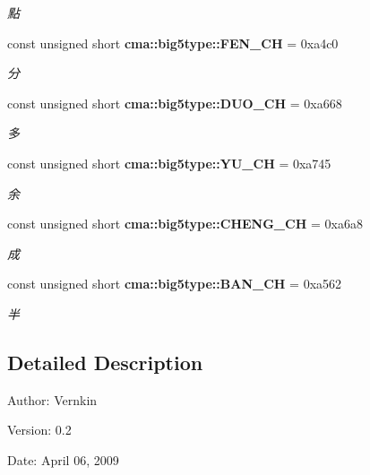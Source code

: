 \begin{CompactItemize}
\begin{CompactList}\small\item\em 點 \item\end{CompactList}\item 
const unsigned short {\bf cma::big5type::FEN\_\-CH} = 0xa4c0\label{namespacecma_1_1big5type_4dd0b0d33393c2d9a27ccee6ab9662d5}

\begin{CompactList}\small\item\em 分 \item\end{CompactList}\item 
const unsigned short {\bf cma::big5type::DUO\_\-CH} = 0xa668\label{namespacecma_1_1big5type_1d5fd266d7448fa2f0ab3ed9ca390fca}

\begin{CompactList}\small\item\em 多 \item\end{CompactList}\item 
const unsigned short {\bf cma::big5type::YU\_\-CH} = 0xa745\label{namespacecma_1_1big5type_e6dac35944033f4c68276abe1e15bf4e}

\begin{CompactList}\small\item\em 余 \item\end{CompactList}\item 
const unsigned short {\bf cma::big5type::CHENG\_\-CH} = 0xa6a8\label{namespacecma_1_1big5type_bcf97c7f2e48d885c33280047c6b6f1d}

\begin{CompactList}\small\item\em 成 \item\end{CompactList}\item 
const unsigned short {\bf cma::big5type::BAN\_\-CH} = 0xa562\label{namespacecma_1_1big5type_02e5ecec79d29ddd78667e14417ff945}

\begin{CompactList}\small\item\em 半 \item\end{CompactList}\end{CompactItemize}


\subsection{Detailed Description}
\begin{Desc}
\item[Author:]Vernkin \end{Desc}
\begin{Desc}
\item[Version:]0.2 \end{Desc}
\begin{Desc}
\item[Date:]April 06, 2009 \end{Desc}

